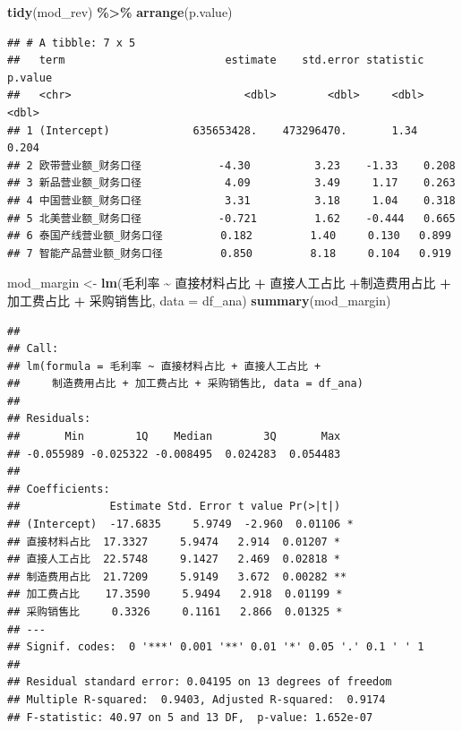 \documentclass[
]{article}
\newenvironment{Shaded}{\begin{snugshade}}{\end{snugshade}}
\newcommand{\AttributeTok}[1]{\textcolor[rgb]{0.13,0.29,0.53}{#1}}
\newcommand{\FunctionTok}[1]{\textcolor[rgb]{0.13,0.29,0.53}{\textbf{#1}}}
\newcommand{\NormalTok}[1]{#1}
\newcommand{\OtherTok}[1]{\textcolor[rgb]{0.56,0.35,0.01}{#1}}
\newcommand{\SpecialCharTok}[1]{\textcolor[rgb]{0.81,0.36,0.00}{\textbf{#1}}}
\begin{document}
\begin{Shaded}
\begin{Highlighting}[]
\FunctionTok{tidy}\NormalTok{(mod\_rev) }\SpecialCharTok{\%\textgreater{}\%} \FunctionTok{arrange}\NormalTok{(p.value)}
\end{Highlighting}
\end{Shaded}

\begin{verbatim}
## # A tibble: 7 x 5
##   term                         estimate    std.error statistic p.value
##   <chr>                           <dbl>        <dbl>     <dbl>   <dbl>
## 1 (Intercept)             635653428.    473296470.       1.34    0.204
## 2 欧带营业额_财务口径            -4.30          3.23    -1.33    0.208
## 3 新品营业额_财务口径             4.09          3.49     1.17    0.263
## 4 中国营业额_财务口径             3.31          3.18     1.04    0.318
## 5 北美营业额_财务口径            -0.721         1.62    -0.444   0.665
## 6 泰国产线营业额_财务口径         0.182         1.40     0.130   0.899
## 7 智能产品营业额_财务口径         0.850         8.18     0.104   0.919
\end{verbatim}

\begin{Shaded}
\begin{Highlighting}[]
\NormalTok{mod\_margin }\OtherTok{\textless{}{-}} \FunctionTok{lm}\NormalTok{(毛利率 }\SpecialCharTok{\textasciitilde{}}\NormalTok{ 直接材料占比 }\SpecialCharTok{+}\NormalTok{ 直接人工占比 }\SpecialCharTok{+}\NormalTok{制造费用占比 }\SpecialCharTok{+}\NormalTok{ 加工费占比 }\SpecialCharTok{+}\NormalTok{ 采购销售比,}
                 \AttributeTok{data =}\NormalTok{ df\_ana)}
\FunctionTok{summary}\NormalTok{(mod\_margin)}
\end{Highlighting}
\end{Shaded}

\begin{verbatim}
## 
## Call:
## lm(formula = 毛利率 ~ 直接材料占比 + 直接人工占比 + 
##     制造费用占比 + 加工费占比 + 采购销售比, data = df_ana)
## 
## Residuals:
##       Min        1Q    Median        3Q       Max 
## -0.055989 -0.025322 -0.008495  0.024283  0.054483 
## 
## Coefficients:
##              Estimate Std. Error t value Pr(>|t|)   
## (Intercept)  -17.6835     5.9749  -2.960  0.01106 * 
## 直接材料占比  17.3327     5.9474   2.914  0.01207 * 
## 直接人工占比  22.5748     9.1427   2.469  0.02818 * 
## 制造费用占比  21.7209     5.9149   3.672  0.00282 **
## 加工费占比    17.3590     5.9494   2.918  0.01199 * 
## 采购销售比     0.3326     0.1161   2.866  0.01325 * 
## ---
## Signif. codes:  0 '***' 0.001 '**' 0.01 '*' 0.05 '.' 0.1 ' ' 1
## 
## Residual standard error: 0.04195 on 13 degrees of freedom
## Multiple R-squared:  0.9403, Adjusted R-squared:  0.9174 
## F-statistic: 40.97 on 5 and 13 DF,  p-value: 1.652e-07
\end{verbatim}
\end{document}
